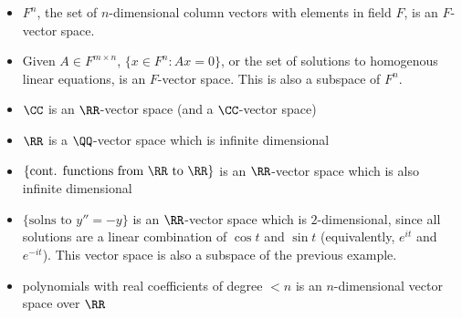 \begin{itemize}
    \item $F^n$, the set of $n$-dimensional column vectors with elements in field $F$, is an $F$-vector space. 
    \item Given $A\in F^{m\times n}$, $\{x\in F^n : Ax=0\}$, or the set of solutions to homogenous linear equations, is an $F$-vector space. This is also a \ac{subspace} of $F^n$. 
    \item $\CC$ is an $\RR$-vector space (and a $\CC$-vector space)
    \item $\RR$ is a $\QQ$-vector space which is infinite dimensional
    \item $\{\text{cont. functions from }\RR\text{ to }\RR\}$ is an $\RR$-vector space which is also infinite dimensional
    \item $\{\text{solns to }y''=-y\}$ is an $\RR$-vector space which is $2$-dimensional, since all solutions are a linear combination of $\cos{t}$ and $\sin {t}$ (equivalently, $e^{it}$ and $e^{-it}$). This vector space is also a subspace of the previous example.
    \item polynomials with real coefficients of degree $<n$ is an $n$-dimensional vector space over $\RR$
\end{itemize}